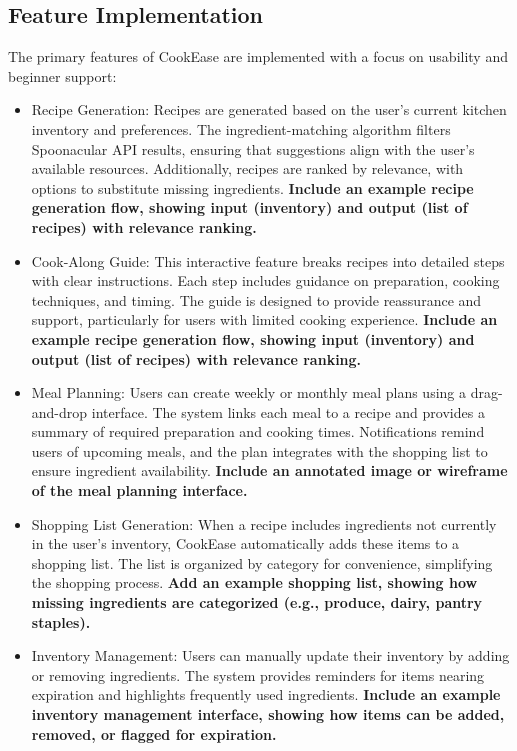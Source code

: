 \documentclass[10pt,twocolumn]{article}
\begin{document}
\subsection{Feature Implementation}
The primary features of CookEase are implemented with a focus on usability and beginner support:
\begin{itemize}
    \item Recipe Generation: Recipes are generated based on the user's current kitchen inventory and preferences. The ingredient-matching algorithm filters Spoonacular API results, ensuring that suggestions align with the user’s available resources. Additionally, recipes are ranked by relevance, with options to substitute missing ingredients. \textbf{Include an example recipe generation flow, showing input (inventory) and output (list of recipes) with relevance ranking.}
    \item Cook-Along Guide: This interactive feature breaks recipes into detailed steps with clear instructions. Each step includes guidance on preparation, cooking techniques, and timing. The guide is designed to provide reassurance and support, particularly for users with limited cooking experience. \textbf{Include an example recipe generation flow, showing input (inventory) and output (list of recipes) with relevance ranking.}
    \item Meal Planning: Users can create weekly or monthly meal plans using a drag-and-drop interface. The system links each meal to a recipe and provides a summary of required preparation and cooking times. Notifications remind users of upcoming meals, and the plan integrates with the shopping list to ensure ingredient availability. \textbf{Include an annotated image or wireframe of the meal planning interface.}
    \item Shopping List Generation: When a recipe includes ingredients not currently in the user’s inventory, CookEase automatically adds these items to a shopping list. The list is organized by category for convenience, simplifying the shopping process. \textbf{Add an example shopping list, showing how missing ingredients are categorized (e.g., produce, dairy, pantry staples).}
    \item Inventory Management: Users can manually update their inventory by adding or removing ingredients. The system provides reminders for items nearing expiration and highlights frequently used ingredients. \textbf{Include an example inventory management interface, showing how items can be added, removed, or flagged for expiration.}
\end{itemize}
\end{document}
